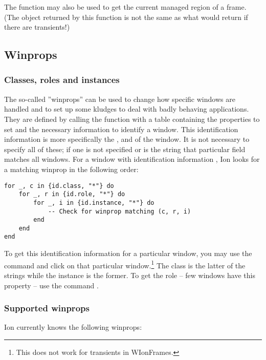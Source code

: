 The function
may also be used to get the current managed region of a frame. (The
object returned by this function is not the same as what
 would return if there are transients!)

\subsection{Winprops}
\label{sec:winprops}

\subsubsection{Classes, roles and instances}

The so-called ''winprops'' can be used to change how
specific windows are handled and to set up some kludges to deal with
badly behaving applications. They are defined by calling the function
 with a table containing the properties to set and the
necessary information to identify a window. This identification
information is more specifically the
,
 and
of the window. It is not necessary to specify all of these; if one is
not specified or is the string  that particular field matches
all windows. For a window with identification information , Ion
looks for a matching winprop in the following order:
\begin{verbatim}
for _, c in {id.class, "*"} do
    for _, r in {id.role, "*"} do
        for _, i in {id.instance, "*"} do
            -- Check for winprop matching (c, r, i)
        end
    end
end
\end{verbatim}

To get this identification information for a particular window, you
may use the command  and click on that
particular window.\footnote{This does not work for transients in
WIonFrames.} The class is the latter of the strings while
the instance is the former. To get the role -- few windows have
this property -- use the command .

\subsubsection{Supported winprops}

Ion currently knows the following winprops:

